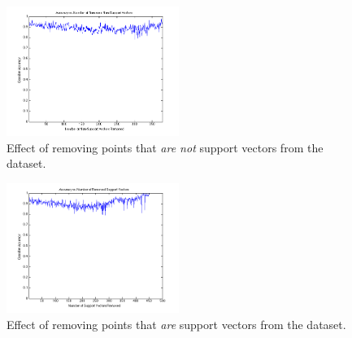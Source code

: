 \documentclass[11pt]{article}
\begin{document}
\begin{enumerate}
\begin{figure}[H]
    \centering
    \includegraphics[width=0.5\textwidth]{removed_nsvs.png}
    \caption{Effect of removing points that \textit{are not} support vectors from the dataset.}
    \label{fig:removed_nsvs}
\end{figure}

\begin{figure}[H]
    \centering
    \includegraphics[width=0.5\textwidth]{removed_svs.png}
    \caption{Effect of removing points that \textit{are} support vectors from the dataset.}
    \label{fig:removed_svs}
\end{figure}


\end{enumerate}
\end{document}
